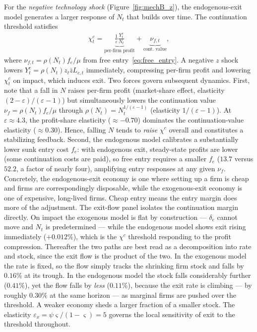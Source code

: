 \documentclass[authoryear, review, 12pt]{elsarticle}
\begin{document}
	For the \emph{negative technology shock} (Figure~\ref{fig:mechB_z}),
	the endogenous-exit model generates a larger response of $N_t$
	that builds over time.
	The continuation threshold satisfies
	\begin{align}\label{eq:xc_decomp}
		\chi_t^c = \underbrace{\frac{1}{\varepsilon}\frac{Y_t^c}{N_t}}_{\text{per-firm profit}} + \underbrace{\nu_{f,t}}_{\text{cont. value}},
	\end{align}
	where $\nu_{f,t}=\rho(N_t) f_e/\mu$ from free entry~\eqref{eq:free_entry}.
	A negative $z$ shock lowers $Y_t^c = \rho(N_t) z_t\bar{z}L_{c,t}$ immediately,
	compressing per-firm profit and lowering $\chi_t^c$ on impact, which induces exit.
	Two forces govern subsequent dynamics.
	First, note that a fall in $N$ raises
	per-firm profit (market-share effect, elasticity $(2{-}\varepsilon)/(\varepsilon{-}1)$)
	but simultaneously lowers the continuation value $\nu_f=\rho(N_t) f_e/\mu$
	through $\rho(N_t)=N_t^{1/(\varepsilon-1)}$ (elasticity $1/(\varepsilon-1)$).
	At $\varepsilon\approx4.3$, the profit-share elasticity ($\approx{-}0.70$)
	dominates the continuation-value elasticity ($\approx0.30$). Hence, falling $N$
	tends to \emph{raise} $\chi^c$ overall and constitutes a stabilizing feedback.
	Second, the endogenous model calibrates a substantially lower sunk entry
	cost $f_e$: with endogenous exit, steady-state profits are lower (some
	continuation costs are paid), so free entry requires a smaller $f_e$
	($13.7$ versus $52.2$, a factor of nearly four), amplifying entry
	responses at any given $\nu_f$. Concretely, the endogenous-exit economy is one where
	setting up a firm is cheap and firms are correspondingly disposable,
	while the exogenous-exit economy is one of expensive, long-lived firms.
	Cheap entry means the entry margin does more of the adjustment.
	The exit-flow panel isolates the continuation margin directly.  On impact
	the exogenous model is flat by construction --- $\delta_e$ cannot move and
	$N_t$ is predetermined --- while the endogenous model shows exit rising
	immediately ($+0.012\%$), which is the $\chi^c$ threshold responding to
	the profit compression.  Thereafter the two paths are best read as a
	decomposition into rate and stock, since the exit flow is the product of
	the two.  In the exogenous model the rate is fixed, so the flow simply
	tracks the shrinking firm stock and falls by $0.16\%$ at its trough.  In
	the endogenous model the stock falls considerably further ($0.41\%$), yet
	the flow falls by \emph{less} ($0.11\%$), because the exit rate is
	climbing --- by roughly $0.30\%$ at the same horizon --- as marginal firms
	are pushed over the threshold.  A weaker economy sheds a larger fraction
	of a smaller stock.  The elasticity
	$\varepsilon_x=\psi\varsigma/(1-\varsigma)=5$ governs the local
	sensitivity of exit to the threshold throughout.
\end{document}
